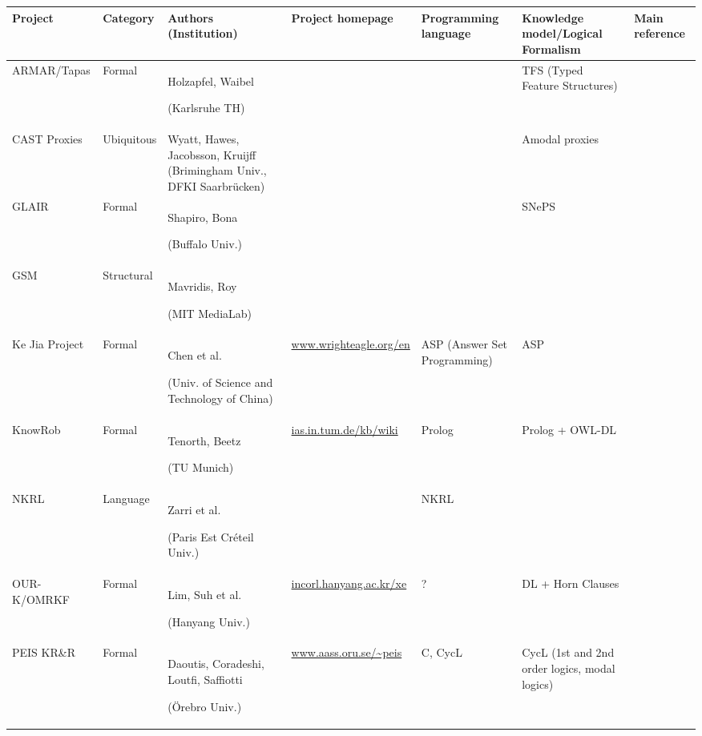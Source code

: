 \begin{landscape}
\begin{table}\scriptsize
\begin{center}

\begin{tabular}{p{2.2cm}p{1.6cm}p{4cm}lp{2.4cm}p{3.4cm}p{1.5cm}}
\toprule
{\bf Project} & {\bf Category} & {\bf Authors (Institution)} & {\bf Project homepage} & {\bf Programming language} & {\bf Knowledge model/Logical Formalism} & Main reference \\
\midrule
ARMAR/Tapas & Formal & Holzapfel, Waibel \par (Karlsruhe TH) & & & TFS (Typed Feature Structures) & \cite{Holzapfel2008}\\
CAST Proxies & Ubiquitous & Wyatt, Hawes, Jacobsson, Kruijff (Brimingham Univ., DFKI Saarbrücken) & & & Amodal proxies & \cite{Jacobsson2008} \\
GLAIR & Formal & Shapiro, Bona \par (Buffalo Univ.) & & & SNePS & \cite{Shapiro2009} \\
GSM & Structural & Mavridis, Roy \par (MIT MediaLab) & & & & \cite{Mavridis2006} \\
Ke Jia Project & Formal & Chen et al. \par (Univ. of Science and Technology of China) & \url{www.wrighteagle.org/en} & ASP (Answer Set Programming) & ASP & \cite{Chen2010} \\
{\sc KnowRob} & Formal & Tenorth, Beetz \par (TU Munich) & \url{ias.in.tum.de/kb/wiki} & {\sc Prolog} & {\sc Prolog} + OWL-DL &  \cite{Tenorth2009a} \\
NKRL & Language & Zarri et al. \par (Paris Est Créteil Univ.) & & NKRL & & \cite{Sabri2011} \\
OUR-K/OMRKF & Formal & Lim, Suh et al. \par (Hanyang Univ.) & \url{incorl.hanyang.ac.kr/xe} & ? & DL + Horn Clauses &  \cite{Lim2011, Suh2007} \\
PEIS KR\&R & Formal & Daoutis, Coradeshi, Loutfi, Saffiotti \par (Örebro Univ.) & \url{www.aass.oru.se/~peis} & {\sc C}, {\sc CycL} & CycL (1st and 2nd order logics, modal logics) & \cite{Daoutis2009} \\

\end{tabular}
\end{center}
\end{table}
\end{landscape}
